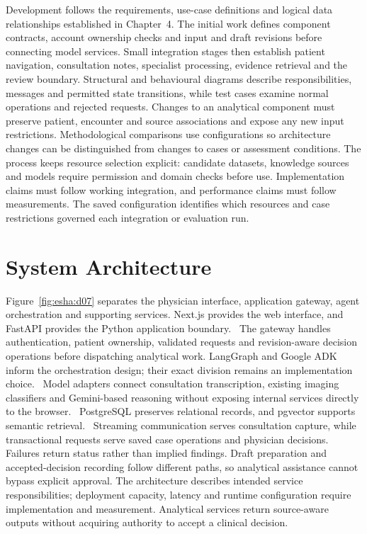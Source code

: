 Development follows the requirements, use-case definitions and logical data relationships established in Chapter~4. The initial work defines component contracts, account ownership checks and input and draft revisions before connecting model services. Small integration stages then establish patient navigation, consultation notes, specialist processing, evidence retrieval and the review boundary. Structural and behavioural diagrams describe responsibilities, messages and permitted state transitions, while test cases examine normal operations and rejected requests. Changes to an analytical component must preserve patient, encounter and source associations and expose any new input restrictions. Methodological comparisons use configurations so architecture changes can be distinguished from changes to cases or assessment conditions. The process keeps resource selection explicit: candidate datasets, knowledge sources and models require permission and domain checks before use. Implementation claims must follow working integration, and performance claims must follow measurements. The saved configuration identifies which resources and case restrictions governed each integration or evaluation run.

\section{System Architecture}

Figure~\ref{fig:esha:d07} separates the physician interface, application gateway, agent orchestration and supporting services. Next.js provides the web interface, and FastAPI provides the Python application boundary.~\cite{zeestC:nextjs,zeestC:fastapi} The gateway handles authentication, patient ownership, validated requests and revision-aware decision operations before dispatching analytical work. LangGraph and Google ADK inform the orchestration design; their exact division remains an implementation choice.~\cite{zeestB:langgraph,zeestB:googleadk} Model adapters connect consultation transcription, existing imaging classifiers and Gemini-based reasoning without exposing internal services directly to the browser.~\cite{zeestC:pytorch,zeestC:gemini} PostgreSQL preserves relational records, and pgvector supports semantic retrieval.~\cite{zeestC:pgvector} Streaming communication serves consultation capture, while transactional requests serve saved case operations and physician decisions. Failures return status rather than implied findings. Draft preparation and accepted-decision recording follow different paths, so analytical assistance cannot bypass explicit approval. The architecture describes intended service responsibilities; deployment capacity, latency and runtime configuration require implementation and measurement.  Analytical services return source-aware outputs without acquiring authority to accept a clinical decision.

